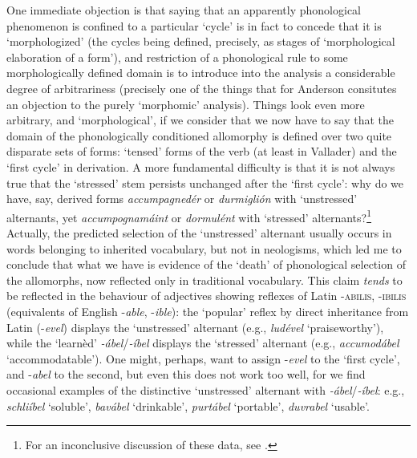 \documentclass[output=paper,
modfonts
]{LSP/langsci}
\begin{document}
One immediate objection is that saying that an apparently phonological
phenomenon is confined to a particular `cycle' is in fact to concede
that it is `morphologized' (the cycles being defined, precisely, as
stages of `morphological elaboration of a form'), and restriction of a
phonological rule to some morphologically defined domain is to introduce
into the analysis a considerable degree of arbitrariness (precisely one
of the things that for Anderson consitutes an objection to the purely
`morphomic' analysis). Things look even more arbitrary, and
`morphological', if we consider that we now have to say that the domain
of the phonologically conditioned allomorphy is defined over two quite
disparate sets of forms: `tensed' forms of the verb (at least in
Vallader) and the `first cycle' in derivation. A more fundamental
difficulty is that it is not always true that the `stressed' stem
persists unchanged after the `first cycle': why do we have, say, derived
forms \emph{accumpagnedér} or \emph{durmiglión} with `unstressed'
alternants, yet \emph{accumpognamáint} or \emph{dormulént} with
`stressed' alternants?\footnote{For an inconclusive discussion of these
  data, see \citet[171]{wolf2013a}.} Actually, the predicted selection of the
`unstressed' alternant usually occurs in words belonging to inherited
vocabulary, but not in neologisms, which led me to conclude \citep[41]{maiden2011a} that what we have is evidence of the `death' of phonological
selection of the allomorphs, now reflected only in traditional
vocabulary. This claim \emph{tends} to be reflected in the behaviour of
adjectives showing reflexes of Latin -\textsc{abilis, -ibilis}
(equivalents of English -\emph{able}, -\emph{ible}): the `popular'
reflex by direct inheritance from Latin (-\emph{evel}) displays the
`unstressed' alternant (e.g., \emph{\emph{ludével}} `praiseworthy'),
while the `learnèd' ­\emph{-ábel}/\emph{-íbel} displays the `stressed'
alternant (e.g., \emph{\emph{accumodábel}} `accommodatable'). One might,
perhaps, want to assign -\emph{evel} to the `first cycle', and
-\emph{abel} to the second, but even this does not work too well, for we
find occasional examples of the distinctive `unstressed' alternant with
\emph{-ábel}/\emph{-íbel}: e.g., \emph{schliíbel} `soluble',
\emph{bavábel} `drinkable', \emph{purtábel} `portable', \emph{duvrabel}
`usable'.
\end{document}
